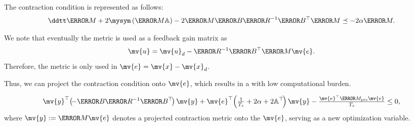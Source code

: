 \begin{frame}{\insertsubsectionhead}{}

    The contraction condition is represented as follows:
    \begin{equation} \label{eq:cstr:ctrc}
    \ddtt\mm{M}
    +
    2\mysym
    \left(
        \mm{M}
        \mathbb{A}
    \right)
    - 
    2
    \mm{M}\mm{B}\mm{R}^{-1}\mm{B}^\top\mm{M}
    \preceq
    -2\alpha \mm{M}
    .
    \end{equation}

    \hfill

    We note that eventually the metric is used as a feedback gain matrix as 
\begin{equation} \label{eq:control:law}
   \mv{u}
   =
   \mv{u}_d
   -
   \mm{R}^{-1} \mm{B}^\top \mm{M}
   \mv{e}
   .
\end{equation}
Therefore, the metric is only used in  $\mv{e} = \mv{x} - \mv{x}_d$.

    \hfill

    Thus, we can project the contraction condition onto $\mv{e}$, which results in a  with low computational burden.

\begin{equation} \label{eq:cstr:ctrc:proj}
   \mv{y}^\top 
   \!
   \left(
   \!
      -\mm{B} \mm{R}^{-1} \mm{B}^\top
   \!
   \right)
   \mv{y}
   +
   \mv{e}^\top
   \!
   \left(
      \tfrac{1}{T_s}+2\alpha
      +
      2\mathbb{A}^\top
   \!
   \right)
   \mv{y}
   -
   \tfrac{\mv{e}^\top \mm{M}_{\rm{pre}} \mv{e}}{T_s}
   \le 0
   ,
\end{equation}
where $\mv{y}:=\mm{M}\mv{e}$ denotes a projected contraction metric onto the $\mv{e}$, serving as a new optimization variable.

\end{frame}


